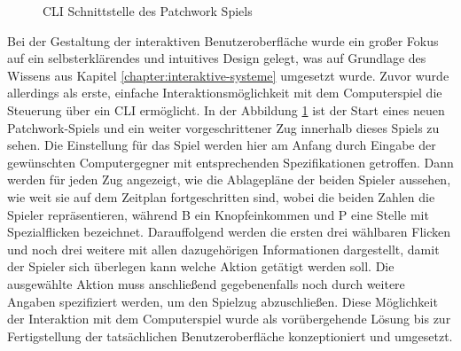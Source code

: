 \begin{figure}[!ht]
{}
    \caption[CLI Schnittstelle des Patchwork Spiels]{\acs{CLI} Schnittstelle des Patchwork Spiels}
    \label{fig:patchwork-console-ui}
\end{figure}

Bei der Gestaltung der interaktiven Benutzeroberfläche wurde ein großer Fokus auf ein selbsterklärendes und intuitives Design gelegt, was auf Grundlage des Wissens aus Kapitel \ref{chapter:interaktive-systeme} umgesetzt wurde. Zuvor wurde allerdings als erste, einfache Interaktionsmöglichkeit mit dem Computerspiel die Steuerung über ein \ac{CLI} ermöglicht. In der Abbildung \ref{fig:patchwork-console-ui} ist der Start eines neuen Patchwork-Spiels und ein weiter vorgeschrittener Zug innerhalb dieses Spiels zu sehen. Die Einstellung für das Spiel werden hier am Anfang durch Eingabe der gewünschten Computergegner mit entsprechenden Spezifikationen getroffen. Dann werden für jeden Zug angezeigt, wie die Ablagepläne der beiden Spieler aussehen, wie weit sie auf dem Zeitplan fortgeschritten sind, wobei die beiden Zahlen die Spieler repräsentieren, während B ein Knopfeinkommen und P eine Stelle mit Spezialflicken bezeichnet. Darauffolgend werden die ersten drei wählbaren Flicken und noch drei weitere mit allen dazugehörigen Informationen dargestellt, damit der Spieler sich überlegen kann welche Aktion getätigt werden soll. Die ausgewählte Aktion muss anschließend gegebenenfalls noch durch weitere Angaben spezifiziert werden, um den Spielzug abzuschließen. Diese Möglichkeit der Interaktion mit dem Computerspiel wurde als vorübergehende Lösung bis zur Fertigstellung der tatsächlichen Benutzeroberfläche konzeptioniert und umgesetzt.

